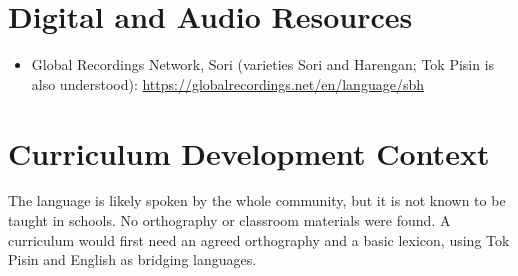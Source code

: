 \documentclass[12pt]{article}
\begin{document}
\section{Digital and Audio Resources}
\begin{itemize}
\item Global Recordings Network, Sori (varieties Sori and Harengan; Tok Pisin is also understood): \url{https://globalrecordings.net/en/language/sbh}
\end{itemize}

\section{Curriculum Development Context}
The language is likely spoken by the whole community, but it is not known to be taught in schools. No orthography or classroom materials were found. A curriculum would first need an agreed orthography and a basic lexicon, using Tok Pisin and English as bridging languages.
\end{document}
